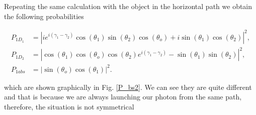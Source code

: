 \documentclass{book}
\begin{document}
Repeating the same calculation with the object in the horizontal path we obtain the following probabilities



\begin{align}
P_{1D_{1}}&=|ie^{i(\gamma_{1}-\gamma_{2})}\cos(\theta_{1})\sin(\theta_{2})\cos(\theta_{o})+i \sin(\theta_{1})\cos(\theta_{2})|^2, \\
P_{1D_{2}}&=|\cos(\theta_{1})\cos(\theta_{o})\cos(\theta_{2})e^{i(\gamma_{1}-\gamma_{2})}- \sin(\theta_{1})\sin(\theta_{2})|^2,\\
P_{1abs}&=|\sin(\theta_{o}) \cos(\theta_{1})|^2 .
\end{align}

which are shown graphically in Fig. \ref{P_bs2}. We can see they are quite different and that is because we are always launching our photon from the same path, therefore, the situation is not symmetrical
\end{document}
